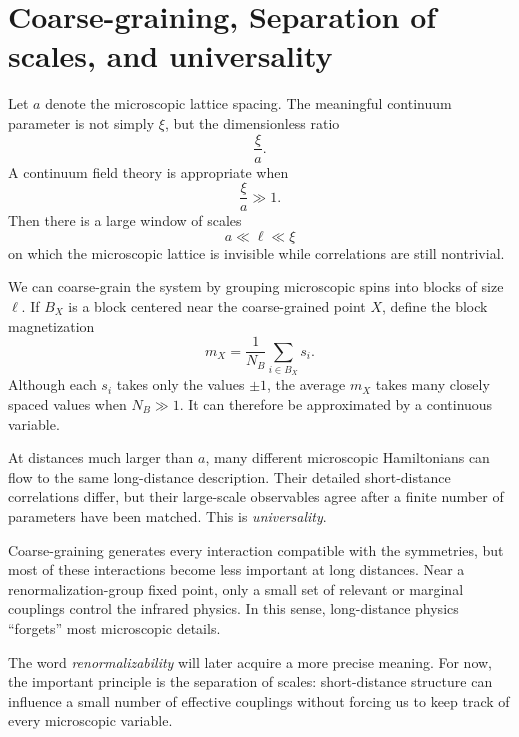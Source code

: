 \documentclass[11pt]{article}
\begin{document}
\section{Coarse-graining, Separation of scales, and universality}

Let $a$ denote the microscopic lattice spacing.  The meaningful continuum parameter is not simply $\xi$, but the dimensionless ratio
\begin{equation}
  \frac{\xi}{a}.
\end{equation}
A continuum field theory is appropriate when
\begin{equation}
  \boxed{\frac{\xi}{a}\gg 1.}
  \label{eq:continuumcriterion}
\end{equation}
Then there is a large window of scales
\begin{equation}
  a\ll \ell\ll \xi
\end{equation}
on which the microscopic lattice is invisible while correlations are still nontrivial.

We can coarse-grain the system by grouping microscopic spins into blocks of size $\ell$.  If $B_X$ is a block centered near the coarse-grained point $X$, define the block magnetization
\begin{equation}
  m_X=\frac{1}{N_B}\sum_{i\in B_X}s_i.
  \label{eq:blockspin}
\end{equation}
Although each $s_i$ takes only the values $\pm1$, the average $m_X$ takes many closely spaced values when $N_B\gg1$.  It can therefore be approximated by a continuous variable.

At distances much larger than $a$, many different microscopic Hamiltonians can flow to the same long-distance description.  Their detailed short-distance correlations differ, but their large-scale observables agree after a finite number of parameters have been matched.  This is \emph{universality}.

\begin{keyidea}
Coarse-graining generates every interaction compatible with the symmetries, but most of these interactions become less important at long distances.  Near a renormalization-group fixed point, only a small set of relevant or marginal couplings control the infrared physics.  In this sense, long-distance physics ``forgets'' most microscopic details.
\end{keyidea}

The word \emph{renormalizability} will later acquire a more precise meaning.  For now, the important principle is the separation of scales: short-distance structure can influence a small number of effective couplings without forcing us to keep track of every microscopic variable.
\end{document}
